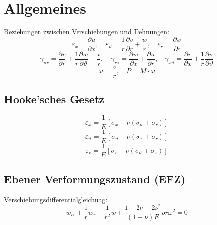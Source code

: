 
\section{Allgemeines} %
	Beziehungen zwischen Verschiebungen und Dehnungen:
	\begin{equation*}
		\varepsilon_x = \frac{\partial u}{\partial x}, \quad \varepsilon_\vartheta = \frac{1}{r} \frac{\partial v}{\partial r} + \frac{w}{r}, \quad \varepsilon_r = \frac{\partial w}{\partial r}
	\end{equation*}
	\begin{equation*}
		\gamma_{\vartheta r} = \frac{\partial v}{\partial r} + \frac{1}{r}\frac{\partial w}{\partial \vartheta} - \frac{v}{r}, \quad \gamma_{rx} = \frac{\partial w}{\partial x} + \frac{\partial u}{\partial r}, \quad \gamma_{x\vartheta} = \frac{\partial v}{\partial x} + \frac{1}{r}\frac{\partial u}{\partial \vartheta}
	\end{equation*}
	\begin{equation*}
		\omega = \frac{v}{r}, \quad P = M \cdot \omega
	\end{equation*}
	
	\subsection{Hooke'sches Gesetz} %
		\begin{equation*}
			\varepsilon_x = \frac{1}{E}[\sigma_x - \nu (\sigma_\vartheta + \sigma_r)]
		\end{equation*}
		\begin{equation*}
			\varepsilon_\vartheta = \frac{1}{E}[\sigma_\vartheta - \nu (\sigma_x + \sigma_r)]
		\end{equation*}
		\begin{equation*}
			\varepsilon_r = \frac{1}{E}[\sigma_r - \nu (\sigma_\vartheta + \sigma_x)]
		\end{equation*}
	\subsection{Ebener Verformungszustand (EFZ)} %
		Verschiebungsdifferentialgleichung:
		\begin{equation*}
			w_{rr} + \frac{1}{r}w_r - \frac{1}{r^2}w + \frac{1-2\nu-2\nu^2}{(1-\nu)E}\rho r \omega^2 = 0
		\end{equation*}
